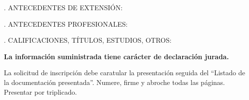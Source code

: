 \documentclass{article}
\begin{document}
\label{begin-extension}
. ANTECEDENTES DE EXTENSIÓN:

\bigskip
\noindent 
\label{end-extension}

\bigskip

\label{begin-profesionales}
. ANTECEDENTES PROFESIONALES:

\bigskip
\noindent 
\label{end-profesionales}

\bigskip

\label{begin-otros}
. CALIFICACIONES, TÍTULOS, ESTUDIOS, OTROS:

\bigskip
\noindent 
\label{end-otros}

\vfill

\begin{center}
{\bf La información suministrada tiene carácter de declaración jurada.

La solicitud de inscripción debe caratular la presentación seguida del ``Listado
de la documentación presentada''. Numere, firme y abroche todas las páginas.
Presentar por triplicado.}
\end{center}
\end{document}
